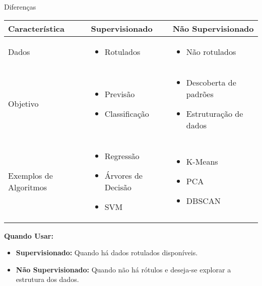 \documentclass{beamer}
\begin{document}
\begin{frame}{Diferenças}
    \scriptsize %

    \begin{tabularx}{\textwidth}{>{\raggedright\arraybackslash}p{3cm} 
                                   >{\raggedright\arraybackslash}p{4cm} 
                                   >{\raggedright\arraybackslash}p{4cm}}
        \toprule
        \textbf{Característica} & \textbf{Supervisionado} & \textbf{Não Supervisionado} \\
        \midrule
        Dados & 
        \begin{itemize}
            \item Rotulados
        \end{itemize} & 
        \begin{itemize}
            \item Não rotulados
        \end{itemize} \\
        
        Objetivo & 
        \begin{itemize}
            \item Previsão
            \item Classificação
        \end{itemize} & 
        \begin{itemize}
            \item Descoberta de padrões
            \item Estruturação de dados
        \end{itemize} \\
        
        Exemplos de Algoritmos & 
        \begin{itemize}
            \item Regressão
            \item Árvores de Decisão
            \item SVM
        \end{itemize} & 
        \begin{itemize}
            \item K-Means
            \item PCA
            \item DBSCAN
        \end{itemize} \\
        \bottomrule
    \end{tabularx}
    
    \vspace{0.3cm}
    
    \textbf{Quando Usar:}
    \begin{itemize}
        \item \textbf{Supervisionado:} Quando há dados rotulados disponíveis.
        \item \textbf{Não Supervisionado:} Quando não há rótulos e deseja-se explorar a estrutura dos dados.
    \end{itemize}
\end{frame}
\end{document}
